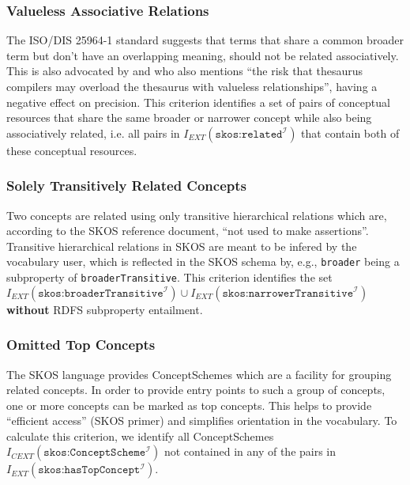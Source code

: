 \subsubsection{Valueless Associative Relations}
The ISO/DIS 25964-1 standard suggests that terms that share a common broader term but don’t have an overlapping meaning, should not be related associatively. This is also advocated by \cite{Hedden2010} and \cite{Aitchison2000} who also mentions ``the risk that thesaurus compilers may overload the thesaurus with valueless relationships'', having a negative effect on precision. This criterion identifies a set of pairs of conceptual resources that share the same broader or narrower concept while also being associatively related, i.e. all pairs in $I_{EXT}(\texttt{skos:related}^\mathcal{I})$ that contain both of these conceptual resources.

\subsubsection{Solely Transitively Related Concepts}
Two concepts are related using only transitive hierarchical relations which are, according to the SKOS reference document, ``not used to make assertions''. Transitive hierarchical relations in SKOS are meant to be infered by the vocabulary user, which is reflected in the SKOS schema by, e.g., \texttt{broader} being a subproperty of \texttt{broaderTransitive}. This criterion identifies the set $I_{EXT}(\texttt{skos:broaderTransitive}^\mathcal{I}) \cup I_{EXT}(\texttt{skos:narrowerTransitive}^\mathcal{I})$ \textbf{without} RDFS subproperty entailment.

\subsubsection{Omitted Top Concepts}
The SKOS language provides ConceptSchemes which are a facility for grouping related concepts. In order to provide entry points to such a group of concepts, one or more concepts can be marked as top concepts. This helps to provide ``efficient access'' (SKOS primer) and simplifies orientation in the vocabulary. To calculate this criterion, we identify all ConceptSchemes $I_{CEXT}(\texttt{skos:ConceptScheme}^\mathcal{I})$ not contained in any of the pairs in $I_{EXT}(\texttt{skos:hasTopConcept}^\mathcal{I})$.


